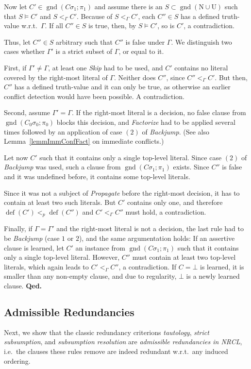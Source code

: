\documentclass[a4paper]{article}
\newcommand{\mGnd}{\operatorname{gnd}} \newcommand{\mLVar}{\operatorname{lvar}} \newcommand{\mRVar}{\operatorname{rvar}} \newcommand{\mDmn}{\operatorname{dom}} \newcommand{\mRng}{\operatorname{rng}} \newcommand{\mMGU}{\operatorname{mgu}} \newcommand{\mDef}{\operatorname{def}} \newcommand{\mDomain}{\mathcal{D}} \newcommand{\mVar}{\operatorname{var}}
\newcommand{\finishproof}{{\bf Qed.}}
\begin{document}
Now let $C' \in \mGnd(C\sigma_1; \pi_1)$ and assume there is an 
$S \subset \mGnd(\text{N}\cup\text{U})$ such that $S \models C'$ and $S <_{\Gamma} C'$.
Because of $S <_{\Gamma} C'$, each $C'' \in S$ has a defined truth-value w.r.t.\
$\Gamma$. If all $C'' \in S$ is true, then, by $S \models C'$, so is $C'$, a contradiction.

Thus, let $C'' \in S$ arbitrary such that $C''$ is false under $\Gamma$.
We distinguish two cases whether $\Gamma'$ is a strict subset of $\Gamma$, or equal to it.

First, if $\Gamma' \ne \Gamma$, at least one \emph{Skip} had to be used,  and $C'$ contains no literal covered by the 
right-most literal of $\Gamma$. Neither does $C''$, since $C'' <_{\Gamma} C'$. But then, $C''$ has a defined truth-value and it 
can only be true, as otherwise an earlier conflict detection would have been possible. A contradiction.

Second, assume $\Gamma' = \Gamma$. 
If the right-most literal is a decision, no false clause from $\mGnd(C_0\sigma_0;\pi_0)$ blocks this decision, and  
\emph{Factorize} had to be applied several times followed by an application of case $(2)$ of \emph{Backjump}. 
(See also Lemma~\ref{lemmImmConfFact} on immediate conflicts.)

Let now $C'$ such that it contains only a single top-level literal. 
Since case $(2)$ of \emph{Backjump} was used, such a clause from $\mGnd(C\sigma_1; \pi_1)$ 
exists. Since $C''$ is false and it was undefined before, 
it contains some top-level literals. 

Since it was not a subject of \emph{Propagate} before the right-most decision, 
it has to contain at least two such literals. 
But $C'$ contains only one, and therefore $\mDef(C') <_p \mDef(C'')$ and $C' <_{\Gamma} C''$ must hold, a contradiction.

Finally, if $\Gamma = \Gamma'$ and the right-most literal is not a decision, the last rule had to be \emph{Backjump} (case $1$ or $2$),
and the same argumentation holds: 
If an assertive clause is learned, let $C'$ an instance from $\mGnd(C\sigma_1; \pi_1)$ such that it contains only a single top-level literal. However, $C''$ 
must contain at least two top-level literals, which again leads to $C' <_{\Gamma} C''$, a contradiction.
If $C = \bot$ is learned, it is smaller than any non-empty clause, and due to regularity, $\bot$ is a newly learned clause.
\finishproof
\subsection{Admissible Redundancies}
Next, we show that the classic redundancy criterions \emph{tautology}, \emph{strict subsumption}, and \emph{subsumption resolution} 
are \emph{admissible redundancies in NRCL}, i.e.\ 
the clauses these rules remove are indeed redundant w.r.t.\
any induced ordering.
\end{document}
